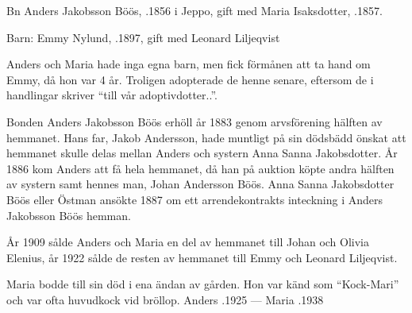 %
Bn Anders Jakobsson Böös, .1856 i Jeppo, gift med  Maria Isaksdotter, .1857.

Barn: Emmy Nylund, .1897, gift med Leonard Liljeqvist

Anders och Maria hade inga egna barn, men fick förmånen att ta hand om Emmy, då hon var 4 år. Troligen adopterade de henne senare, eftersom de i handlingar skriver ``till vår adoptivdotter..''.

Bonden Anders Jakobsson Böös erhöll år 1883 genom arvsförening hälften av  hemmanet. Hans far, Jakob Andersson, hade muntligt på sin dödsbädd önskat att hemmanet skulle delas mellan Anders och systern Anna Sanna Jakobsdotter. År 1886 kom Anders att få hela hemmanet, då han på auktion köpte andra hälften av systern samt hennes man, Johan Andersson Böös. Anna Sanna Jakobsdotter Böös eller Östman ansökte 1887 om ett arrendekontrakts inteckning i Anders Jakobsson Böös hemman.

År 1909 sålde Anders och Maria en del av hemmanet till Johan och Olivia Elenius, år 1922 sålde de resten av hemmanet till Emmy och Leonard Liljeqvist.

Maria bodde till sin död i ena ändan av gården. Hon var känd som ``Kock-Mari'' och var ofta huvudkock vid bröllop.
Anders .1925  ---  Maria .1938


